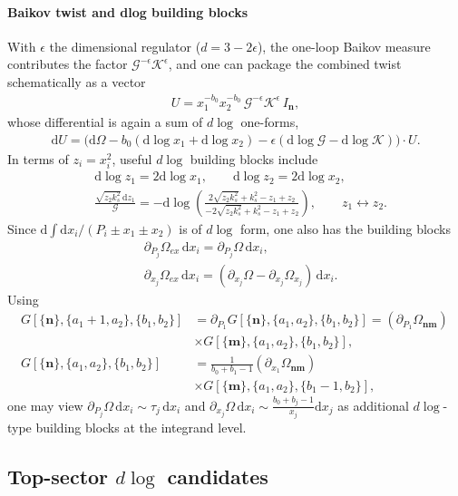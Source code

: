\documentclass[a4paper,12pt]{article}
\newcommand{\n}{\nonumber}
\def\di{{\mathrm{d}}}
\def\ep{\epsilon}
\newcommand{\mG}{\mathcal{G}}
\newcommand{\mK}{\mathcal{K}}
\begin{document}
\paragraph{Baikov twist and dlog building blocks}
With $\ep$ the dimensional regulator ($d=3-2\ep$), the one-loop Baikov measure contributes the factor $\mG^{-\ep}\mK^{\ep}$, and one can package the combined twist schematically as a vector
\begin{align}
	U = x_1^{-b_0}x_2^{-b_0}\,\mG^{-\ep}\mK^{\ep}\,I_{\bm n},
\end{align}
whose differential is again a sum of $d\log$ one-forms,
\begin{align}
	\di U=\Big(\di\Omega-b_0(\di\log x_1+\di\log x_2)-\ep(\di\log \mG-\di\log \mK)\Big)\cdot U.
\end{align}
In terms of $z_i=x_i^2$, useful $d\log$ building blocks include
\begin{align}
	&\di\log z_1=2\di\log x_1,\qquad \di\log z_2=2\di\log x_2,\n\\
	&\frac{\sqrt{z_2 k_s^2}\,\di z_1}{\mG}
	= - \di \log \left(\frac{2 \sqrt{z_2 k_s^2}+k_s^2-z_1+z_2}{-2 \sqrt{z_2 k_s^2}+k_s^2-z_1+z_2}\right),
	\qquad z_1\leftrightarrow z_2.
\end{align}
Since $\di\!\int \di x_i/(P_i\pm x_1\pm x_2)$ is of $d\log$ form, one also has the building blocks
\begin{align}
	&\partial_{P_j}\Omega_{ex}\,\di x_i = \partial_{P_j}\Omega\,\di x_i, \n\\
	&\partial_{x_j}\Omega_{ex}\,\di x_i = (\partial_{x_j}\Omega-\partial_{x_j}\Omega_{x_j})\,\di x_i.
\end{align}
Using
\begin{align}
	G[\{\bm{n}\},\{a_1+1,a_2\},\{b_1,b_2\}]
	&=\partial_{P_1}G[\{\bm{n}\},\{a_1,a_2\},\{b_1,b_2\}]
	=\left(\partial_{P_1}\Omega_{\bm n\bm m}\right)\,\n\\
	&\times G[\{\bm{m}\},\{a_1,a_2\},\{b_1,b_2\}], \n\\
	G[\{\bm{n}\},\{a_1,a_2\},\{b_1,b_2\}]
	&=\frac{1}{b_0+b_1-1}\left(\partial_{x_1}\Omega_{\bm n\bm m}\right)\,\n\\
	&\times G[\{\bm{m}\},\{a_1,a_2\},\{b_1-1,b_2\}],
\end{align}
one may view $\partial_{P_j}\Omega\,\di x_i\sim \tau_j\,\di x_i$ and
$\partial_{x_j}\Omega\,\di x_i\sim \frac{b_0+b_j-1}{x_j}\di x_j$
as additional $d\log$-type building blocks at the integrand level.

\subsection{Top-sector \texorpdfstring{$d\log$}{dlog} candidates}
\end{document}
